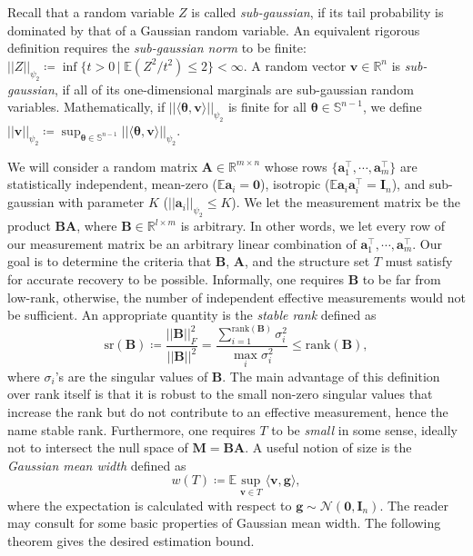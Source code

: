 \documentclass{article}
\begin{document}
\par
Recall that a random variable $Z$ is called \textit{sub-gaussian}, if its tail probability is dominated by that of a Gaussian random variable. An equivalent rigorous definition requires the \textit{sub-gaussian norm} to be finite: $||Z||_{\psi_2} \coloneqq \inf \big\{t > 0 \, \big | \; \mathbb{E}(Z^2/t^2) \leq 2 \big\} < \infty $. A random vector $\mathbf{v} \in \mathbb{R}^n$ is \textit{sub-gaussian}, if all of its one-dimensional marginals are sub-gaussian random variables. Mathematically, if $||\langle \mathbf{\theta}, \mathbf{v} \rangle||_{\psi_2}$ is finite for all $\mathbf{\theta} \in \mathbb{S}^{n-1}$, we define $ ||\mathbf{v}||_{\psi_2} \coloneqq \sup_{\mathbf{\theta} \in \mathbb{S}^{n-1}} ||\langle \mathbf{\theta}, \mathbf{v} \rangle||_{\psi_2}$.

We will consider a random matrix $\mathbf{A} \in \mathbb{R}^{m \times n}$ whose rows $\{\mathbf{a}_1^\top, \cdots, \mathbf{a}_m^\top\}$ are statistically independent, mean-zero ($\mathbb{E}\mathbf{a}_i = \mathbf{0}$), isotropic ($\mathbb{E} \mathbf{a}_i \mathbf{a}_i^\top = \mathbf{I}_n$), and sub-gaussian with parameter $K$ ($||\mathbf{a}_i||_{\psi_2} \leq K$). We let the measurement matrix be the product $\mathbf{B}\mathbf{A}$, where $\mathbf{B} \in \mathbb{R}^{l \times m}$ is arbitrary. In other words, we let every row of our measurement matrix be an arbitrary linear combination of $\mathbf{a}_1^\top, \cdots, \mathbf{a}_m^\top$. Our goal is to determine the criteria that $\mathbf{B}$, $\mathbf{A}$, and the structure set $T$ must satisfy for accurate recovery to be possible. Informally, one requires $\mathbf{B}$ to be far from low-rank, otherwise, the number of independent effective measurements would not be sufficient. An appropriate quantity is the \textit{stable rank} defined as
\begin{equation}
    \mathrm{sr}(\mathbf{B}) \coloneqq \frac{||\mathbf{B}||_F^2}{||\mathbf{B}||^2} = \frac{\sum_{i=1}^{\mathrm{rank}(\mathbf{B})} \sigma_i^2}{\max_{i} \sigma_i^2} \leq \mathrm{rank}(\mathbf{B}),
\end{equation}
where $\sigma_i$'s are the singular values of $\mathbf{B}$. The main advantage of this definition over rank itself is that it is robust to the small non-zero singular values that increase the rank but do not contribute to an effective measurement, hence the name stable rank. Furthermore, one requires $T$ to be \textit{small} in some sense, ideally not to intersect the null space of $\mathbf{M} = \mathbf{B}\mathbf{A}$. A useful notion of size is the \textit{Gaussian mean width} defined as
\begin{equation}
    w(T) \coloneqq \mathbb{E} \sup_{\mathbf{v} \in T} \langle \mathbf{v}, \mathbf{g} \rangle,
\end{equation}
where the expectation is calculated with respect to $\mathbf{g} \sim \mathcal{N}(\mathbf{0}, \mathbf{I}_n)$. The reader may consult \cite{plan2012robust} for some basic properties of Gaussian mean width. The following theorem gives the desired estimation bound.
\end{document}
